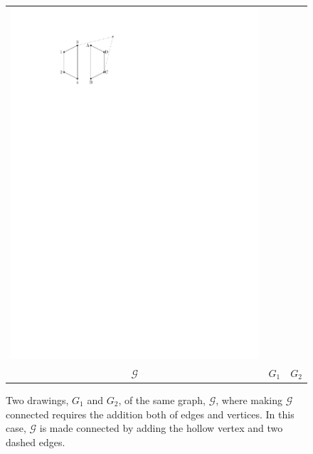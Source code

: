 \documentclass[11pt]{patmorin}
\begin{document}
\begin{figure}[hb]
{\begin{tabular}{ccc}
      \includegraphics{img/bad-example-2} \\
      $\mathcal{G}$ & $G_1$ & $G_2$ 
    \end{tabular}
  }
  \caption{Two drawings, $G_1$ and $G_2$, of the same graph, $\mathcal{G}$, where making $\mathcal{G}$ connected requires the addition both of edges and vertices. In this case, $\mathcal G$ is made connected by adding the hollow vertex and two dashed edges.}
  \label{fig:bad-example}
\end{figure}
\end{document}
